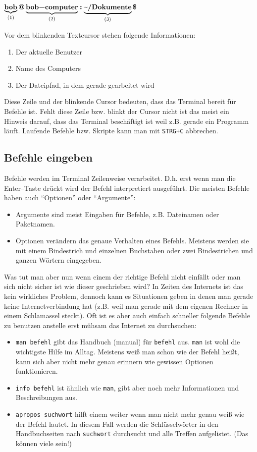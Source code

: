 \( \underbrace{\textbf{\lstinline|bob|}}_{(1)} \textbf{\lstinline|@|} \underbrace{\textbf{\lstinline|bob-computer|}}_{(2)} \textbf{\lstinline|:|} \underbrace{\textbf{\textapprox\lstinline|/Dokumente|}}_{(3)} \textbf{\lstinline|$|} \)

Vor dem blinkenden Textcursor stehen folgende Informationen:
\begin{enumerate}
\item Der aktuelle Benutzer
\item Name des Computers
\item Der Dateipfad, in dem gerade gearbeitet wird
\end{enumerate}

Diese Zeile und der blinkende Cursor bedeuten, dass das Terminal bereit für Befehle ist. Fehlt diese Zeile bzw. blinkt der Cursor nicht ist das meist ein Hinweis darauf, dass das Terminal beschäftigt ist weil z.B. gerade ein Programm läuft. Laufende Befehle bzw. Skripte kann man mit \lstinline|STRG+C| abbrechen.

\subsection{Befehle eingeben}
Befehle werden im Terminal Zeilenweise verarbeitet. D.h. erst wenn man die Enter--Taste drückt wird der Befehl interpretiert ausgeführt. Die meisten Befehle haben auch ``Optionen'' oder ``Argumente'':
\begin{itemize}
 \item Argumente sind meist Eingaben für Befehle, z.B. Dateinamen oder Paketnamen.
 \item Optionen verändern das genaue Verhalten eines Befehls. Meistens werden sie mit einem Bindestrich und einzelnen Buchstaben oder zwei Bindestrichen und ganzen Wörtern eingegeben.
\end{itemize}
Was tut man aber nun wenn einem der richtige Befehl nicht einfällt oder man sich nicht sicher ist wie dieser geschrieben wird? In Zeiten des Internets ist das kein wirkliches Problem, dennoch kann es Situationen geben in denen man gerade keine Internetverbindung hat (z.B. weil man gerade mit dem eigenen Rechner in einem Schlamassel steckt). Oft ist es aber auch einfach schneller folgende Befehle zu benutzen anstelle erst mühsam das Internet zu durchsuchen:
\begin{itemize}
 \item \lstinline|man befehl| gibt das Handbuch (manual) für \lstinline|befehl| aus. \lstinline|man| ist wohl die wichtigste Hilfe im Alltag. Meistens weiß man schon wie der Befehl heißt, kann sich aber nicht mehr genau erinnern wie gewissen Optionen funktionieren.
 \item \lstinline|info befehl| ist ähnlich wie \lstinline|man|, gibt aber noch mehr Informationen und Beschreibungen aus.
 \item \lstinline|apropos suchwort| hilft einem weiter wenn man nicht mehr genau weiß wie der Befehl lautet. In diesem Fall werden die Schlüsselwörter in den Handbuchseiten nach \lstinline|suchwort| durchsucht und alle Treffen aufgelistet. (Das können viele sein!)
\end{itemize}

